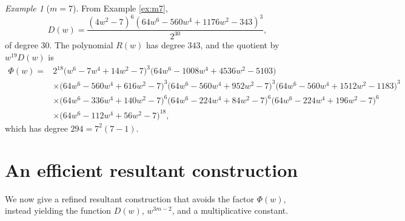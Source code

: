 \documentclass[11pt,reqno]{amsart}
\theoremstyle{remark}
\newtheorem{example}[theorem]{Example}
\begin{document}
\begin{example}[$m = 7$]
From Example \ref{ex:m7},
\[
D(w) = \frac{(4w^2-7)^6(64w^6-560w^4+1176w^2-343)^3}{2^{30}},
\]
of degree $30$. The polynomial $R(w)$ has degree $343$, and the quotient by $w^{19}D(w)$ is
\begin{align*}
\Phi(w) = {} & 2^{18}\bigl(w^6-7w^4+14w^2-7\bigr)^3\bigl(64w^6-1008w^4+4536w^2-5103\bigr) \\
& \times\bigl(64w^6-560w^4+616w^2-7\bigr)^3\bigl(64w^6-560w^4+952w^2-7\bigr)^3
\bigl(64w^6-560w^4+1512w^2-1183\bigr)^3 \\
& \times\bigl(64w^6-336w^4+140w^2-7\bigr)^6\bigl(64w^6-224w^4+84w^2-7\bigr)^6
\bigl(64w^6-224w^4+196w^2-7\bigr)^6 \\
& \times\bigl(64w^6-112w^4+56w^2-7\bigr)^{18},
\end{align*}
which has degree $294 = 7^2(7-1)$.
\end{example}


\section{An efficient resultant construction}\label{sec:second-construction}

We now give a refined resultant construction that avoids the factor
$\Phi(w)$, instead yielding the function $D(w)$, $w^{3m-2}$, and
a multiplicative constant.
\end{document}
